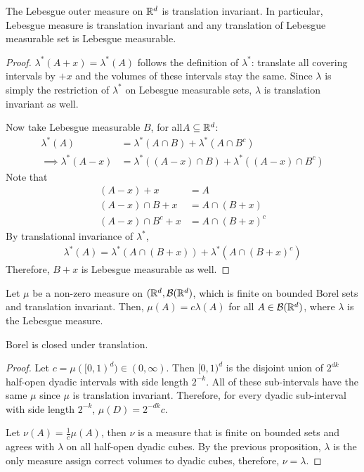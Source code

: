 \documentclass[11pt]{article}
\begin{document}
	\begin{proposition}
		The Lebesgue outer measure on $\mathbb{R}^d$ is translation invariant. In particular, Lebesgue measure is translation invariant and any translation of Lebesgue measurable set is Lebesgue measurable.
		\begin{proof}
			$\lambda^*(A + x) = \lambda^*(A)$ follows the definition of $\lambda^*$: translate all covering intervals by $+x$ and the volumes of these intervals stay the same. Since $\lambda$ is simply the restriction of $\lambda^*$ on Lebesgue measurable sets, $\lambda$ is translation invariant as well.
			
			Now take Lebesgue measurable $B$, for all$A \subseteq \mathbb{R}^d$:
			\begin{align}
				\lambda^*(A) &= \lambda^*(A \cap B) + \lambda^*(A \cap B^c) \\
				\implies \lambda^*(A-x) &= \lambda^*((A-x) \cap B) + \lambda^*((A-x) \cap B^c)
			\end{align}
			Note that
			\begin{align}
				(A - x) + x &= A \\
				(A - x) \cap B + x &= A \cap (B + x) \\
				(A - x) \cap B^c + x &= A \cap (B + x)^c
			\end{align}
			By translational invariance of $\lambda^*$, 
			\begin{align}
				\lambda^*(A) = \lambda^*(A \cap (B+x)) + \lambda^*(A \cap (B+x)^c)
			\end{align}
			Therefore, $B + x$ is Lebesgue measurable as well.
		\end{proof}
	\end{proposition}

	\begin{theorem}
		Let $\mu$ be a non-zero measure on $(\mathbb{R}^d, \mathcal{{B}}(\mathbb{R}^d)$, which is finite on bounded Borel sets and translation invariant. Then, $\mu(A) = c \lambda(A)$ for all $A \in \mathcal{{B}}(\mathbb{R}^d)$, where $\lambda$ is the Lebesgue measure.
	\end{theorem}
	
	\begin{remark}
		Borel \salg is closed under translation.
	\end{remark}
	
	\begin{proof}
		Let $c = \mu([0, 1)^d) \in (0, \infty)$. Then $[0, 1)^d$ is the disjoint union of $2^{dk}$ half-open dyadic intervals with side length $2^{-k}$. All of these sub-intervals have the same $\mu$ since $\mu$ is translation invariant. Therefore, for every dyadic sub-interval with side length $2^{-k}$, $\mu(D) = 2^{-dk} c$.
		
		Let $\nu(A) = \frac{1}{c} \mu(A)$, then $\nu$ is a measure that is finite on bounded sets and agrees with $\lambda$ on all half-open dyadic cubes. By the previous proposition, $\lambda$ is the only measure assign correct volumes to dyadic cubes, therefore, $\nu = \lambda$.
	\end{proof}
	
\end{document}

